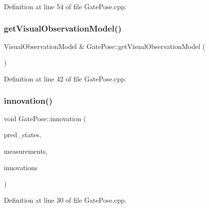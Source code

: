 Definition at line 54 of file Gate\+Pose.\+cpp.

\mbox{\label{classGatePose_aa47f9242f039b8752675db5594350a28}} 
\subsubsection{\texorpdfstring{get\+Visual\+Observation\+Model()}{getVisualObservationModel()}}
{\footnotesize\ttfamily Visual\+Observation\+Model \& Gate\+Pose\+::get\+Visual\+Observation\+Model (\begin{DoxyParamCaption}{ }\end{DoxyParamCaption})\hspace{0.3cm}{\ttfamily [override]}}



Definition at line 42 of file Gate\+Pose.\+cpp.

\mbox{\label{classGatePose_a00607a4325dcfb7a02bda7490b65d25c}} 
\subsubsection{\texorpdfstring{innovation()}{innovation()}}
{\footnotesize\ttfamily void Gate\+Pose\+::innovation (\begin{DoxyParamCaption}\item[{const Eigen\+::\+Ref$<$ const Eigen\+::\+Matrix\+Xf $>$ \&}]{pred\+\_\+states,  }\item[{cv\+::\+Input\+Array}]{measurements,  }\item[{Eigen\+::\+Ref$<$ Eigen\+::\+Matrix\+Xf $>$}]{innovations }\end{DoxyParamCaption})\hspace{0.3cm}{\ttfamily [override]}}



Definition at line 30 of file Gate\+Pose.\+cpp.

\mbox{\label{classGatePose_ad2e8708b3ed5a8252bdec1494f199fda}} 
